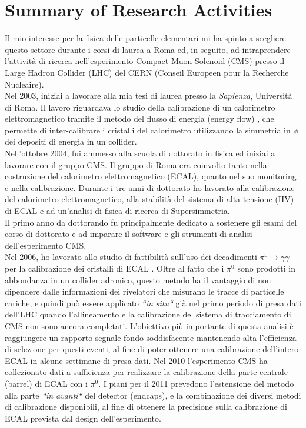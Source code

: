 \documentclass[10pt, a4paper]{article}
\begin{document}
\section*{Summary of Research Activities}
Il mio interesse per la fisica delle particelle elementari mi ha spinto a scegliere questo settore durante 
i corsi di laurea a Roma ed, in seguito, ad intraprendere l'attivit\`a di ricerca nell'esperimento 
Compact Muon Solenoid (CMS) presso il Large Hadron Collider (LHC) del CERN
(Conseil Europeen pour la Recherche Nucleaire). \\

Nel 2003, iniziai a lavorare alla mia tesi di laurea presso la \textit{Sapienza}, Universit\`a di Roma. Il lavoro riguardava lo studio della calibrazione di un calorimetro elettromagnetico tramite il metodo del flusso di energia (energy flow) \cite{Santanastasio:LAUREA}, che permette di inter-calibrare i cristalli del calorimetro utilizzando la simmetria in $\phi$ dei depositi di energia in un collider. \\

Nell'ottobre 2004, fui ammesso alla scuola di dottorato in fisica ed iniziai a lavorare con il gruppo CMS. 
Il gruppo di Roma era coinvolto tanto nella costruzione del calorimetro elettromagnetico (ECAL), quanto nel suo 
monitoring e nella calibrazione. Durante i tre anni di dottorato ho lavorato alla calibrazione del calorimetro elettromagnetico, 
alla stabilit\`a del sistema di alta tensione (HV) di ECAL e ad un'analisi di fisica di ricerca di Supersimmetria.  \\

Il primo anno da dottorando fu principalmente dedicato a sostenere gli esami del corso di dottorato e ad imparare 
il software e gli strumenti di analisi dell'esperimento CMS. \\

Nel 2006, ho lavorato allo studio di fattibilit\`a sull'uso dei decadimenti $\pi^0 \rightarrow \gamma\gamma$ per la 
calibrazione dei cristalli di ECAL \cite{Adzic:2008zza,DN-2007-013,IN-2006-050}. Oltre al fatto che i $\pi^0$ sono prodotti 
in abbondanza in un collider adronico, questo metodo ha il vantaggio di non dipendere dalle informazioni dei rivelatori 
che misurano le tracce di particelle cariche, e quindi pu\`o essere applicato {\it ``in situ``} gi\`a nel primo periodo di presa dati 
dell'LHC quando l'allineamento e la calibrazione del sistema di tracciamento di CMS non sono ancora completati. 
L'obiettivo pi\`u importante di questa analisi \`e raggiungere un rapporto segnale-fondo soddisfacente mantenendo alta 
l'efficienza di selezione per questi eventi, al fine di poter ottenere una calibrazione dell'intero ECAL in alcune settimane di presa dati. 
Nel 2010 l'esperimento CMS ha collezionato dati a sufficienza per realizzare la calibrazione della parte centrale (barrel) 
di ECAL con i $\pi^0$. I piani per il 2011 prevedono l'estensione del metodo alla parte {\it ``in avanti``} del detector (endcaps), 
e la combinazione dei diversi metodi di calibrazione disponibili, al fine di ottenere la precisione sulla calibrazione di ECAL 
prevista dal design dell'esperimento. \\
\end{document}
